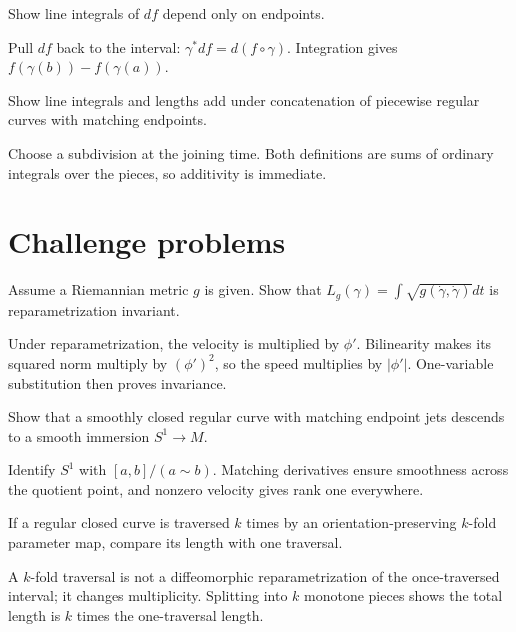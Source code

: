 \begin{problem}\label{prob:vii12-11}
Show line integrals of $df$ depend only on endpoints.
\end{problem}
\begin{solution}
Pull $df$ back to the interval: $\gamma^*df=d(f\circ\gamma)$. Integration gives $f(\gamma(b))-f(\gamma(a))$.
\end{solution}

\begin{problem}\label{prob:vii12-12}
Show line integrals and lengths add under concatenation of piecewise regular curves with matching endpoints.
\end{problem}
\begin{solution}
Choose a subdivision at the joining time. Both definitions are sums of ordinary integrals over the pieces, so additivity is immediate.
\end{solution}


\section{Challenge problems}

\begin{problem}\label{prob:vii12-ch01}
Assume a Riemannian metric $g$ is given. Show that $L_g(\gamma)=\int\sqrt{g(\dot\gamma,\dot\gamma)}dt$ is reparametrization invariant.
\end{problem}
\begin{solution}
Under reparametrization, the velocity is multiplied by $\phi'$. Bilinearity makes its squared norm multiply by $(\phi')^2$, so the speed multiplies by $|\phi'|$. One-variable substitution then proves invariance.
\end{solution}

\begin{problem}\label{prob:vii12-ch02}
Show that a smoothly closed regular curve with matching endpoint jets descends to a smooth immersion $S^1\to M$.
\end{problem}
\begin{solution}
Identify $S^1$ with $[a,b]/(a\sim b)$. Matching derivatives ensure smoothness across the quotient point, and nonzero velocity gives rank one everywhere.
\end{solution}

\begin{problem}\label{prob:vii12-ch03}
If a regular closed curve is traversed $k$ times by an orientation-preserving $k$-fold parameter map, compare its length with one traversal.
\end{problem}
\begin{solution}
A $k$-fold traversal is not a diffeomorphic reparametrization of the once-traversed interval; it changes multiplicity. Splitting into $k$ monotone pieces shows the total length is $k$ times the one-traversal length.
\end{solution}

